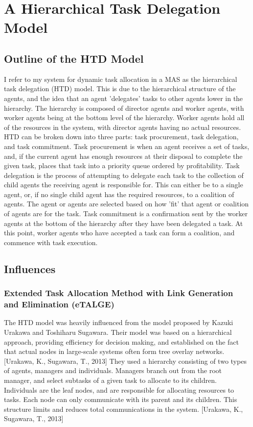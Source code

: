 \documentclass[12pt,letterpaper,onecolumn]{article}
\begin{document}
	\section{A Hierarchical Task Delegation Model}
	\subsection{Outline of the HTD Model}
	I refer to my system for dynamic task allocation in a MAS as the hierarchical task delegation (HTD) model. This is due to the hierarchical structure of the agents, and the idea that an agent 'delegates' tasks to other agents lower in the hierarchy. The hierarchy is composed of director agents and worker agents, with worker agents being at the bottom level of the hierarchy. Worker agents hold all of the resources in the system, with director agents having no actual resources. HTD can be broken down into three parts: task procurement, task delegation, and task commitment. Task procurement is when an agent receives a set of tasks, and, if the current agent has enough resources at their disposal to complete the given task, places that task into a priority queue ordered by profitability. Task delegation is the process of attempting to delegate each task to the collection of child agents the receiving agent is responsible for. This can either be to a single agent, or, if no single child agent has the required resources, to a coalition of agents. The agent or agents are selected based on how 'fit' that agent or coalition of agents are for the task. Task commitment is a confirmation sent by the worker agents at the bottom of the hierarchy after they have been delegated a task. At this point, worker agents who have accepted a task can form a coalition, and commence with task execution.
	\subsection{Influences}
	\subsubsection{Extended Task Allocation Method with Link Generation and Elimination (eTALGE)}
	The HTD model was heavily influenced from the model proposed by Kazuki Urakawa and Toshiharu Sugawara. Their model was based on a hierarchical approach, providing efficiency for decision making, and established on the fact that actual nodes in large-scale systems often form tree overlay networks. [Urakawa, K., Sugawara, T., 2013] They used a hierarchy consisting of two types of agents, managers and individuals. Managers branch out from the root manager, and select subtasks of a given task to allocate to its children. Individuals are the leaf nodes, and are responsible for allocating resources to tasks. Each node can only communicate with its parent and its children. This structure limits and reduces total communications in the system. [Urakawa, K., Sugawara, T., 2013]
\end{document}
